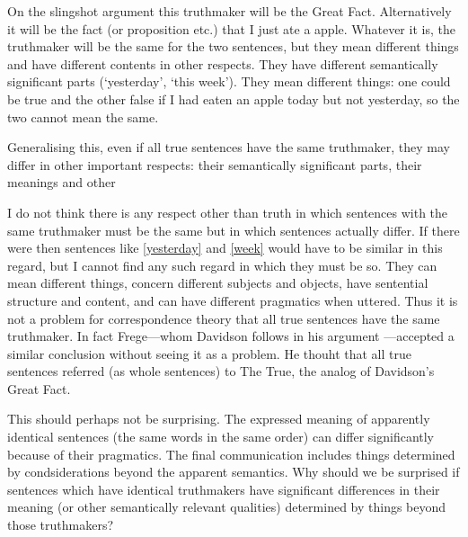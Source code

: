 On the slingshot argument this truthmaker will be the Great Fact.
Alternatively it will be the fact (or proposition etc.) that I just ate a apple.
Whatever it is, the truthmaker will be the same for the two sentences, but they mean different things and have different contents in other respects.
They have different semantically significant parts (`yesterday', `this week').
They mean different things: one could be true and the other false if I had eaten an apple today but not yesterday, so the two cannot mean the same.

Generalising this, even if all true sentences have the same truthmaker, they may differ in other important respects: their semantically significant parts, their meanings and other 

I do not think there is any respect other than truth in which sentences with the same truthmaker must be the same but in which sentences actually differ. 
If there were then sentences like \ref{yesterday} and \ref{week} would have to be similar in this regard, but I cannot find any such regard in which they must be so.
They can mean different things, concern different subjects and objects, have sentential structure and content, and can have different pragmatics when uttered.
Thus it is not a problem for correspondence theory that all true sentences have the same truthmaker.
In fact Frege---whom Davidson follows in his argument \parencite[750]{Davidson_1969}---accepted a similar conclusion without seeing it as a problem.
He thouht that all true sentences referred (as whole sentences) to The True, the analog of Davidson's Great Fact.
\parencite[216]{Frege_1948}

This should perhaps not be surprising.
The expressed meaning of apparently identical sentences (the same words in the same order) can differ significantly because of their pragmatics.
The final communication includes things determined by condsiderations beyond the apparent semantics. 
Why should we be surprised if sentences which have identical truthmakers have significant differences in their meaning (or other semantically relevant qualities) determined by things beyond those truthmakers?

